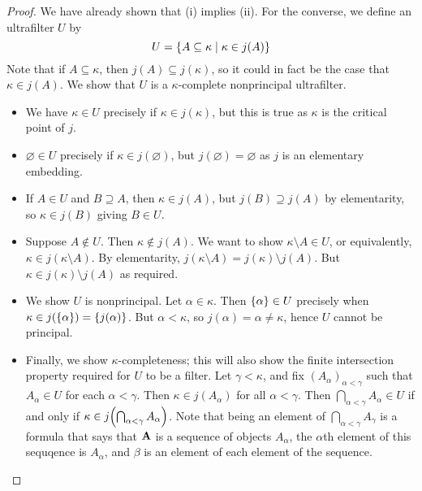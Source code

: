 \begin{proof}
    We have already shown that (i) implies (ii).
    For the converse, we define an ultrafilter \( U \) by
    \[ U = \qty{A \subseteq \kappa \mid \kappa \in j(A)} \]
    Note that if \( A \subseteq \kappa \), then \( j(A) \subseteq j(\kappa) \), so it could in fact be the case that \( \kappa \in j(A) \).
    We show that \( U \) is a \( \kappa \)-complete nonprincipal ultrafilter.
    \begin{itemize}
        \item We have \( \kappa \in U \) precisely if \( \kappa \in j(\kappa) \), but this is true as \( \kappa \) is the critical point of \( j \).
        \item \( \varnothing \in U \) precisely if \( \kappa \in j(\varnothing) \), but \( j(\varnothing) = \varnothing \) as \( j \) is an elementary embedding.
        \item If \( A \in U \) and \( B \supseteq A \), then \( \kappa \in j(A) \), but \( j(B) \supseteq j(A) \) by elementarity, so \( \kappa \in j(B) \) giving \( B \in U \).
        \item Suppose \( A \notin U \).
        Then \( \kappa \notin j(A) \).
        We want to show \( \kappa \setminus A \in U \), or equivalently, \( \kappa \in j(\kappa \setminus A) \).
        By elementarity, \( j(\kappa \setminus A) = j(\kappa) \setminus j(A) \).
        But \( \kappa \in j(\kappa) \setminus j(A) \) as required.
        \item We show \( U \) is nonprincipal.
        Let \( \alpha \in \kappa \).
        Then \( \qty{\alpha} \in U \) precisely when \( \kappa \in j(\qty{\alpha}) = \qty{j(\alpha)} \).
        But \( \alpha < \kappa \), so \( j(\alpha) = \alpha \neq \kappa \), hence \( U \) cannot be principal.
        \item Finally, we show \( \kappa \)-completeness; this will also show the finite intersection property required for \( U \) to be a filter.
        Let \( \gamma < \kappa \), and fix \( (A_\alpha)_{\alpha < \gamma} \) such that \( A_\alpha \in U \) for each \( \alpha < \gamma \).
        Then \( \kappa \in j(A_\alpha) \) for all \( \alpha < \gamma \).
        Then \( \bigcap_{\alpha < \gamma} A_\alpha \in U \) if and only if \( \kappa \in j\qty(\bigcap_{\alpha < \gamma} A_\alpha) \).
        Note that being an element of \( \bigcap_{\alpha < \gamma} A_\gamma \) is a formula that says that \( \vb A \) is a sequence of objects \( A_\alpha \), the \( \alpha \)th element of this sequqence is \( A_\alpha \), and \( \beta \) is an element of each element of the sequence.

\end{itemize}
\end{proof}
